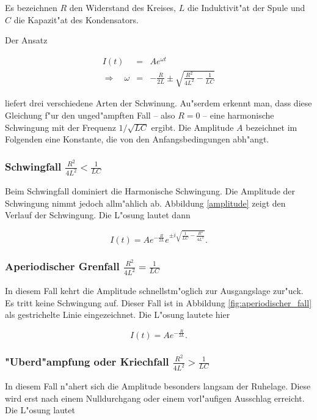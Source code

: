 	Es bezeichnen $R$ den Widerstand des Kreises, $L$ die Induktivit"at der Spule und $C$ die Kapazit"at des Kondensators.

	Der Ansatz 

	\begin{eqnarray*}
		I(t) & = & Ae^{\omega t} \nonumber \\
		\Rightarrow \quad \omega & = & - \frac{R}{2L} \pm \sqrt{\frac{R^2}{4L^2} - \frac{1}{LC}}
	\end{eqnarray*}

	liefert drei verschiedene Arten der Schwinung. Au"serdem erkennt man, dass diese Gleichung f"ur den unged"ampften Fall -- also $R = 0$ -- eine harmonische Schwingung mit der Frequenz $1/\sqrt{LC}$ ergibt.
	Die Amplitude $A$ bezeichnet im Folgenden eine Konstante, die von den Anfangsbedingungen abh"angt.

	\subsubsection{Schwingfall $\frac{R^2}{4L^2} < \frac{1}{LC}$}
		Beim Schwingfall dominiert die Harmonische Schwingung.
		Die Amplitude der Schwingung nimmt jedoch allm"ahlich ab.
		Abbildung \ref{amplitude} zeigt den Verlauf der Schwingung.
		Die L"osung lautet dann

		\begin{equation*}
			I(t) = A e^{-\frac{R}{2L}} e^{\pm i \sqrt{\frac{1}{LC}- \frac{R^2}{4L^2}}}.
		\end{equation*}

	\subsubsection{Aperiodischer Grenfall $\frac{R^2}{4L^2} = \frac{1}{LC}$}
		In diesem Fall kehrt die Amplitude schnellstm"oglich zur Ausgangslage zur"uck.
		Es tritt keine Schwingung auf.
		Dieser Fall ist in Abbildung \ref{fig:aperiodischer_fall} als gestrichelte Linie eingezeichnet.
		Die L"osung lautete hier

		\begin{equation*}
			I(t) = A e^{-\frac{R}{2L}}.
		\end{equation*}

	\subsubsection{"Uberd"ampfung oder Kriechfall $\frac{R^2}{4L^2} > \frac{1}{LC}$}
		In diesem Fall n"ahert sich die Amplitude besonders langsam der Ruhelage.
		Diese wird erst nach einem Nulldurchgang oder einem vorl"aufigen Ausschlag erreicht.
		Die L"osung lautet

